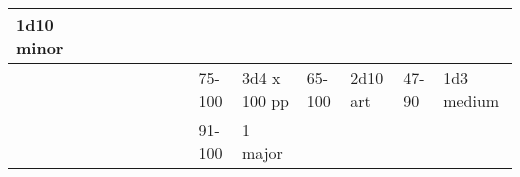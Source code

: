 \begin{longtable}{llllllllllllll}
{\begin{minipage}[t]{0.469in}
1d10 minor\end{minipage}}\\
\hline
\multicolumn{8}{p{1.150in}|}{\begin{minipage}[t]{1.150in}\centering
\end{minipage}} & \multicolumn{1}{|p{0.393in}|}{\begin{minipage}[t]{0.393in}\raggedright
75-100\end{minipage}} & \multicolumn{1}{p{0.469in}|}{\begin{minipage}[t]{0.469in}\raggedright
3d4 x 100 pp\end{minipage}} & \multicolumn{1}{p{0.923in}|}{\begin{minipage}[t]{0.923in}\raggedright
65-100\end{minipage}} & \multicolumn{1}{p{0.469in}|}{\begin{minipage}[t]{0.469in}\raggedright
2d10 art\end{minipage}} & \multicolumn{1}{p{0.626in}|}{\begin{minipage}[t]{0.626in}\raggedright
47-90\end{minipage}} & \multicolumn{1}{p{0.469in}|}{\begin{minipage}[t]{0.469in}\centering
1d3 medium\end{minipage}}\\
\hline
\multicolumn{8}{p{1.150in}|}{\begin{minipage}[t]{1.150in}\centering
\end{minipage}} & \multicolumn{1}{|p{0.393in}|}{\begin{minipage}[t]{0.393in}\raggedright
91-100\end{minipage}} & \multicolumn{1}{p{0.469in}|}{\begin{minipage}[t]{0.469in}\raggedright
1 major\end{minipage}} & \multicolumn{1}{p{0.923in}|}{\begin{minipage}[t]{0.923in}\raggedright
\end{minipage}} & \multicolumn{1}{p{0.469in}|}{\begin{minipage}[t]{0.469in}\raggedright
\end{minipage}} & \multicolumn{1}{p{0.626in}|}{\begin{minipage}[t]{0.626in}\raggedright
\end{minipage}} & \multicolumn{1}{p{0.469in}|}{\begin{minipage}[t]{0.469in}\centering
\end{minipage}}\\

\end{longtable}
